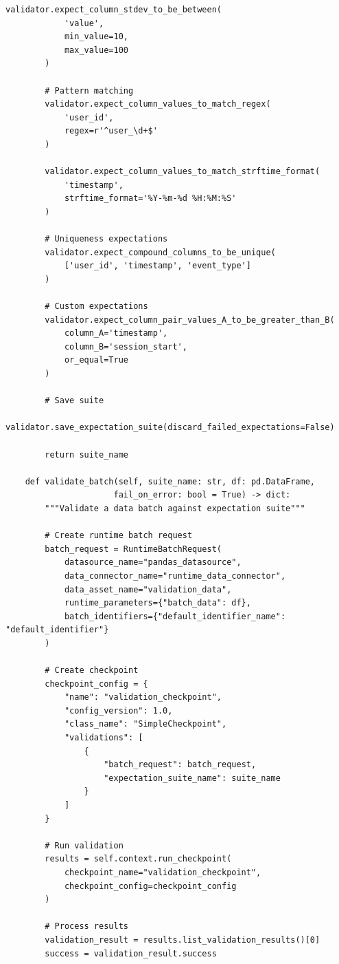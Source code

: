 \begin{lstlisting}[style=python, caption=Comprehensive data validation with Great Expectations]
        validator.expect_column_stdev_to_be_between(
            'value',
            min_value=10,
            max_value=100
        )

        # Pattern matching
        validator.expect_column_values_to_match_regex(
            'user_id',
            regex=r'^user_\d+$'
        )

        validator.expect_column_values_to_match_strftime_format(
            'timestamp',
            strftime_format='%Y-%m-%d %H:%M:%S'
        )

        # Uniqueness expectations
        validator.expect_compound_columns_to_be_unique(
            ['user_id', 'timestamp', 'event_type']
        )

        # Custom expectations
        validator.expect_column_pair_values_A_to_be_greater_than_B(
            column_A='timestamp',
            column_B='session_start',
            or_equal=True
        )

        # Save suite
        validator.save_expectation_suite(discard_failed_expectations=False)

        return suite_name

    def validate_batch(self, suite_name: str, df: pd.DataFrame,
                      fail_on_error: bool = True) -> dict:
        """Validate a data batch against expectation suite"""

        # Create runtime batch request
        batch_request = RuntimeBatchRequest(
            datasource_name="pandas_datasource",
            data_connector_name="runtime_data_connector",
            data_asset_name="validation_data",
            runtime_parameters={"batch_data": df},
            batch_identifiers={"default_identifier_name": "default_identifier"}
        )

        # Create checkpoint
        checkpoint_config = {
            "name": "validation_checkpoint",
            "config_version": 1.0,
            "class_name": "SimpleCheckpoint",
            "validations": [
                {
                    "batch_request": batch_request,
                    "expectation_suite_name": suite_name
                }
            ]
        }

        # Run validation
        results = self.context.run_checkpoint(
            checkpoint_name="validation_checkpoint",
            checkpoint_config=checkpoint_config
        )

        # Process results
        validation_result = results.list_validation_results()[0]
        success = validation_result.success


\end{lstlisting}
